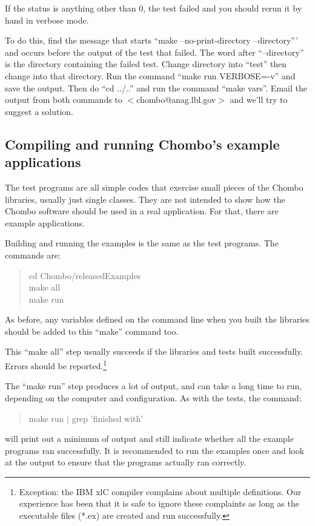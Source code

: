 If the status is anything other than 0, the test failed and you should rerun
it by hand in verbose mode.

To do this, find the message that starts ``make --no-print-directory
--directory''' and occurs before the output of the test that failed.  The
word after ``--directory'' is the directory containing the failed test.
Change directory into ``test'' then change into that directory.  Run the
command ``make run VERBOSE=-v'' and save the output.  Then do ``cd ../..''
and run the command ``make vars''.  Email the output from both commands to
$<$chombo@anag.lbl.gov$>$ and we'll try to suggest a solution.


\subsection{Compiling and running Chombo's example applications}

The test programs are all simple codes that exercise small pieces of the
Chombo libraries, usually just single classes.  They are not intended to
show how the Chombo software should be used in a real application.  For
that, there are example applications.

Building and running the examples is the same as the test programs.  The commands are:
\begin{quote}
 cd Chombo/releasedExamples\\
 make all\\
 make run
\end{quote}

As before, any variables defined on the command line when you built the libraries
should be added to this ``make'' command too.  

This ``make all'' step usually succeeds if the libraries and tests built
successfully.  Errors should be reported.\footnote{Exception: the IBM xlC
compiler complains about multiple definitions.  Our experience has
been that it is safe to ignore these complaints as long as the
executable  files (*.ex) are created and run successfully.}

The ``make run'' step produces a lot of output, and can take a long time to
run, depending on the computer and configuration.  As with the tests, the
command:
\begin{quote}
  make run $|$ grep 'finished with'
\end{quote}
will print out a minimum of output and still indicate whether all the example 
programs ran successfully.  It is recommended to run the examples once and look
at the output to ensure that the programs actually ran correctly.

